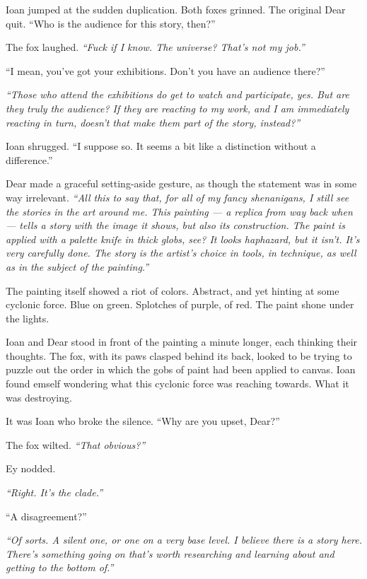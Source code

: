 Ioan jumped at the sudden duplication. Both foxes grinned. The original Dear quit. ``Who is the audience for this story, then?''

The fox laughed. \emph{``Fuck if I know. The universe? That's not my job.''}

``I mean, you've got your exhibitions. Don't you have an audience there?''

\emph{``Those who attend the exhibitions do get to watch and participate, yes. But are they truly the audience? If they are reacting to my work, and I am immediately reacting in turn, doesn't that make them part of the story, instead?''}

Ioan shrugged. ``I suppose so. It seems a bit like a distinction without a difference.''

Dear made a graceful setting-aside gesture, as though the statement was in some way irrelevant. \emph{``All this to say that, for all of my fancy shenanigans, I still see the stories in the art around me. This painting — a replica from way back when — tells a story with the image it shows, but also its construction. The paint is applied with a palette knife in thick globs, see? It looks haphazard, but it isn't. It's very carefully done. The story is the artist's choice in tools, in technique, as well as in the subject of the painting.''}

The painting itself showed a riot of colors. Abstract, and yet hinting at some cyclonic force. Blue on green. Splotches of purple, of red. The paint shone under the lights.

Ioan and Dear stood in front of the painting a minute longer, each thinking their thoughts. The fox, with its paws clasped behind its back, looked to be trying to puzzle out the order in which the gobs of paint had been applied to canvas. Ioan found emself wondering what this cyclonic force was reaching towards. What it was destroying.

It was Ioan who broke the silence. ``Why are you upset, Dear?''

The fox wilted. \emph{``That obvious?''}

Ey nodded.

\emph{``Right. It's the clade.''}

``A disagreement?''

\emph{``Of sorts. A silent one, or one on a very base level. I believe there is a story here. There's something going on that's worth researching and learning about and getting to the bottom of.''}

